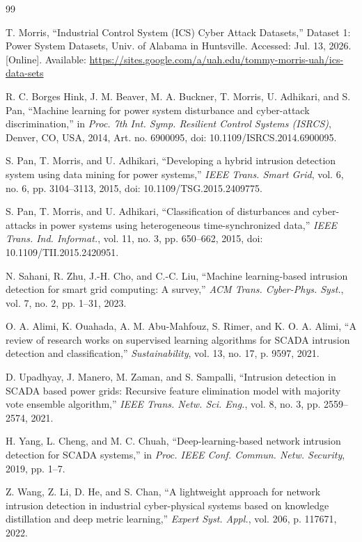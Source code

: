 \documentclass[conference]{IEEEtran}
\begin{document}
\begin{thebibliography}{99}

T. Morris, ``Industrial Control System (ICS) Cyber Attack Datasets,''
Dataset 1: Power System Datasets, Univ. of Alabama in Huntsville.
Accessed: Jul. 13, 2026. [Online]. Available:
\url{https://sites.google.com/a/uah.edu/tommy-morris-uah/ics-data-sets}

R. C. Borges Hink, J. M. Beaver, M. A. Buckner, T. Morris, U. Adhikari,
and S. Pan, ``Machine learning for power system disturbance and cyber-attack
discrimination,'' in \emph{Proc. 7th Int. Symp. Resilient Control Systems
(ISRCS)}, Denver, CO, USA, 2014, Art. no. 6900095,
doi: 10.1109/ISRCS.2014.6900095.

S. Pan, T. Morris, and U. Adhikari,
``Developing a hybrid intrusion detection system using data mining for power
systems,'' \emph{IEEE Trans. Smart Grid}, vol. 6, no. 6,
pp. 3104--3113, 2015, doi: 10.1109/TSG.2015.2409775.

S. Pan, T. Morris, and U. Adhikari,
``Classification of disturbances and cyber-attacks in power systems using
heterogeneous time-synchronized data,'' \emph{IEEE Trans. Ind. Informat.},
vol. 11, no. 3, pp. 650--662, 2015,
doi: 10.1109/TII.2015.2420951.

N. Sahani, R. Zhu, J.-H. Cho, and C.-C. Liu,
``Machine learning-based intrusion detection for smart grid computing: A
survey,'' \emph{ACM Trans. Cyber-Phys. Syst.}, vol. 7, no. 2,
pp. 1--31, 2023.

O. A. Alimi, K. Ouahada, A. M. Abu-Mahfouz, S. Rimer, and
K. O. A. Alimi, ``A review of research works on supervised learning
algorithms for SCADA intrusion detection and classification,''
\emph{Sustainability}, vol. 13, no. 17, p. 9597, 2021.

D. Upadhyay, J. Manero, M. Zaman, and S. Sampalli,
``Intrusion detection in SCADA based power grids: Recursive feature
elimination model with majority vote ensemble algorithm,''
\emph{IEEE Trans. Netw. Sci. Eng.}, vol. 8, no. 3,
pp. 2559--2574, 2021.

H. Yang, L. Cheng, and M. C. Chuah,
``Deep-learning-based network intrusion detection for SCADA systems,''
in \emph{Proc. IEEE Conf. Commun. Netw. Security}, 2019, pp. 1--7.

Z. Wang, Z. Li, D. He, and S. Chan,
``A lightweight approach for network intrusion detection in industrial
cyber-physical systems based on knowledge distillation and deep metric
learning,'' \emph{Expert Syst. Appl.}, vol. 206, p. 117671, 2022.


\end{thebibliography}
\end{document}
